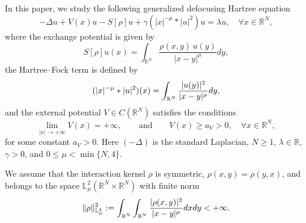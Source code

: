 \documentclass[12pt,thmsa]{article}
\begin{document}
In this paper, we study the following generalized defocusing Hartree
equation
\begin{equation}
-\Delta u+V(x)u-S[\rho ]u+\gamma (|x|^{-\mu }\ast |u|^{2})u=\lambda u,\quad
\forall x\in \mathbb{R}^{N},  \label{eq:M}
\end{equation}%
where the exchange potential is given by
\begin{equation*}
S[\rho ]u(x)=\int_{\mathbb{R}^{N}}\frac{\rho (x,y)\,u(y)}{|x-y|^{\mu }}dy,
\end{equation*}%
the Hartree--Fock term is defined by
\begin{equation*}
(|x|^{-\mu }\ast |u|^{2})(x)=\int_{\mathbb{R}^{N}}\frac{|u(y)|^{2}}{%
|x-y|^{\mu }}dy,
\end{equation*}%
and the external potential $V\in C(\mathbb{R}^{N})$ satisfies the conditions
\begin{equation}
\lim_{|x|\rightarrow +\infty }V(x)=+\infty ,\qquad \text{and}\qquad V(x)\geq
a_{V}>0,\quad \forall x\in \mathbb{R}^{N},  \label{cond:V}
\end{equation}%
for some constant $a_{V}>0$. Here $(-\Delta )$ is the standard Laplacian, $%
N\geq 1$, $\lambda \in \mathbb{R}$, $\gamma >0$, and $0\leq \mu <\min
\{N,4\} $.

We assume that the interaction kernel $\rho$ is symmetric, $\rho(x,y) =
\rho(y,x)$, and belongs to the space $\mathbb{L}_\mu^2(\mathbb{R}^N \times
\mathbb{R}^N)$ with finite norm
\begin{equation*}
\| \rho \|_{\mathbb{L}_{\mu}^{2}}^{2} := \int_{\mathbb{R}^{N}} \int_{\mathbb{%
R}^{N}} \frac{|\rho(x,y)|^{2}}{|x-y|^{\mu}}dxdy < +\infty.
\end{equation*}
\end{document}
